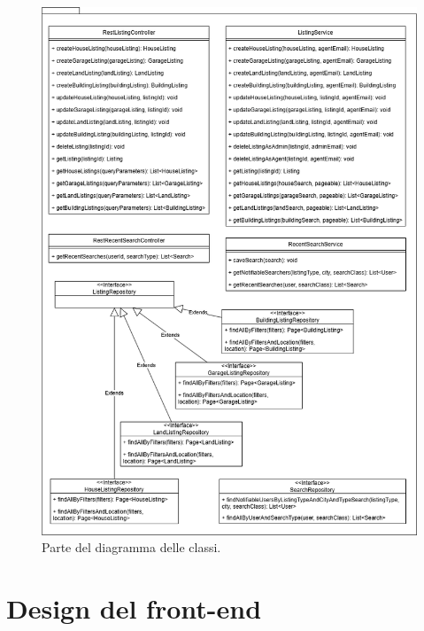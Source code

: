 \begin{figure}[h]
    \centering
    \includegraphics[width=\textwidth]{assets/diagrams/class-diagram/class-diagram-4.png}
    \caption{Parte del diagramma delle classi.}
    \label{fig:Parte 4 del diagramma delle classi}
\end{figure}


\section{Design del front-end}